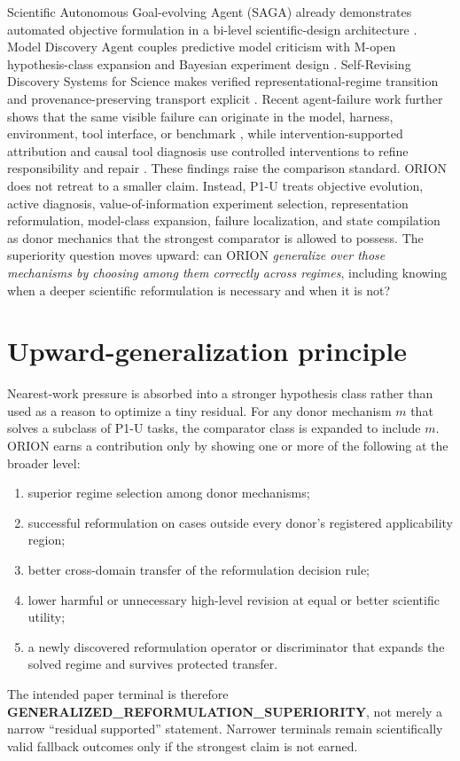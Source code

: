 \documentclass[11pt]{article}
\begin{document}
Scientific Autonomous Goal-evolving Agent (SAGA) already demonstrates automated objective formulation in a bi-level scientific-design architecture \cite{saga2026}. Model Discovery Agent couples predictive model criticism with M-open hypothesis-class expansion and Bayesian experiment design \cite{mda2026}. Self-Revising Discovery Systems for Science makes verified representational-regime transition and provenance-preserving transport explicit \cite{selfrevising2026}. Recent agent-failure work further shows that the same visible failure can originate in the model, harness, environment, tool interface, or benchmark \cite{modelorharness2026}, while intervention-supported attribution and causal tool diagnosis use controlled interventions to refine responsibility and repair \cite{reflect2026,architect2026}. These findings raise the comparison standard. ORION does not retreat to a smaller claim. Instead, P1-U treats objective evolution, active diagnosis, value-of-information experiment selection, representation reformulation, model-class expansion, failure localization, and state compilation as donor mechanics that the strongest comparator is allowed to possess. The superiority question moves upward: can ORION \emph{generalize over those mechanisms by choosing among them correctly across regimes}, including knowing when a deeper scientific reformulation is necessary and when it is not?

\section{Upward-generalization principle}
Nearest-work pressure is absorbed into a stronger hypothesis class rather than used as a reason to optimize a tiny residual. For any donor mechanism $m$ that solves a subclass of P1-U tasks, the comparator class is expanded to include $m$. ORION earns a contribution only by showing one or more of the following at the broader level:
\begin{enumerate}[leftmargin=*]
    \item superior regime selection among donor mechanisms;
    \item successful reformulation on cases outside every donor's registered applicability region;
    \item better cross-domain transfer of the reformulation decision rule;
    \item lower harmful or unnecessary high-level revision at equal or better scientific utility;
    \item a newly discovered reformulation operator or discriminator that expands the solved regime and survives protected transfer.
\end{enumerate}
The intended paper terminal is therefore \textbf{GENERALIZED_REFORMULATION_SUPERIORITY}, not merely a narrow ``residual supported'' statement. Narrower terminals remain scientifically valid fallback outcomes only if the strongest claim is not earned.
\end{document}
